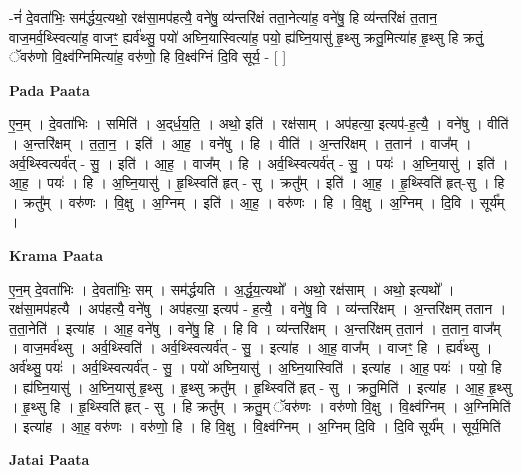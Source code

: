 \documentclass[17pt]{extarticle}
\begin{document}
-नं॑ दे॒वता॑भिः॒ सम॑र्द्धय॒त्यथो॒ रक्ष॑सा॒मप॑हत्यै॒ वने॑षु॒ व्य॑न्तरि॑क्षं तता॒नेत्या॑ह॒ वने॑षु॒ हि व्य॑न्तरि॑क्षं त॒तान॒ वाज॒मर्व॒थ्स्वित्या॑ह॒ वाजꣳ॒॒ ह्यर्व॑थ्सु॒ पयो॑ अघ्नि॒यास्वित्या॑ह॒ पयो॒ ह्य॑घ्नि॒यासु॑ हृ॒थ्सु क्रतु॒मित्या॑ह हृ॒थ्सु हि क्रतुं॒ ॅवरु॑णो वि॒क्ष्व॑ग्निमित्या॑ह॒ वरु॑णो॒ हि वि॒क्ष्व॑ग्निं दि॒वि सूर्य॒ - [  ] \newline

\textbf{Pada Paata} \newline

ए॒न॒म् । दे॒वता॑भिः । समिति॑ । अ॒द्‌र्ध॒य॒ति॒ । अथो॒ इति॑ । रक्ष॑साम् । अप॑हत्या॒ इत्यप॑-ह॒त्यै॒ । वने॑षु । वीति॑ । अ॒न्तरि॑क्षम् । त॒ता॒न॒ । इति॑ । आ॒ह॒ । वने॑षु । हि । वीति॑ । अ॒न्तरि॑क्षम् । त॒तान॑ । वाज᳚म् । अर्व॒थ्स्वित्यर्व॑त् - सु॒ । इति॑ । आ॒ह॒ । वाज᳚म् । हि । अर्व॒थ्स्वित्यर्व॑त् - सु॒ । पयः॑ । अ॒घ्नि॒यासु॑ । इति॑ । आ॒ह॒ । पयः॑ । हि । अ॒घ्नि॒यासु॑ । हृ॒थ्स्विति॑ हृत् - सु । क्रतु᳚म् । इति॑ । आ॒ह॒ । हृ॒थ्स्विति॑ हृत्-सु । हि । क्रतु᳚म् । वरु॑णः । वि॒क्षु । अ॒ग्निम् । इति॑ । आ॒ह॒ । वरु॑णः । हि । वि॒क्षु । अ॒ग्निम् । दि॒वि । सूर्य᳚म् ।  \newline


\textbf{Krama Paata} \newline

ए॒न॒म् दे॒वता॑भिः । दे॒वता॑भिः॒ सम् । सम॑र्द्धयति । अ॒र्द्ध॒य॒त्यथो᳚ । अथो॒ रक्ष॑साम् । अथो॒ इत्यथो᳚ । रक्ष॑सा॒मप॑हत्यै । अप॑हत्यै॒ वने॑षु । अप॑हत्या॒ इत्यप॑ - ह॒त्यै॒ । वने॑षु॒ वि । व्य॑न्तरि॑क्षम् । अ॒न्तरि॑क्षम् ततान । त॒ता॒नेति॑ । इत्या॑ह । आ॒ह॒ वने॑षु । वने॑षु॒ हि । हि वि । व्य॑न्तरि॑क्षम् । अ॒न्तरि॑क्षम् त॒तान॑ । त॒तान॒ वाज᳚म् । वाज॒मर्व॑थ्सु । अर्व॒थ्स्विति॑ । अर्व॒थ्स्वित्यर्व॑त् - सु॒ । इत्या॑ह । आ॒ह॒ वाज᳚म् । वाजꣳ॒॒ हि । ह्यर्व॑थ्सु । अर्व॑थ्सु॒ पयः॑ । अर्व॒थ्स्वित्यर्व॑त् - सु॒ । पयो॑ अघ्नि॒यासु॑ । अ॒घ्नि॒यास्विति॑ । इत्या॑ह । आ॒ह॒ पयः॑ । पयो॒ हि । ह्य॑घ्नि॒यासु॑ । अ॒घ्नि॒यासु॑ हृ॒थ्सु । हृ॒थ्सु क्रतु᳚म् । हृ॒थ्स्विति॑ हृत् - सु । क्रतु॒मिति॑ । इत्या॑ह । आ॒ह॒ हृ॒थ्सु । हृ॒थ्सु हि । हृ॒थ्स्विति॑ हृत् - सु । हि क्रतु᳚म् । क्रतु॒म् ॅवरु॑णः । वरु॑णो वि॒क्षु । वि॒क्ष्व॑ग्निम् । अ॒ग्निमिति॑ । इत्या॑ह । आ॒ह॒ वरु॑णः । वरु॑णो॒ हि । हि वि॒क्षु । वि॒क्ष्व॑ग्निम् । अ॒ग्निम् दि॒वि । दि॒वि सूर्य᳚म् । सूर्य॒मिति॑ \newline

\textbf{Jatai Paata} \newline
\end{document}
